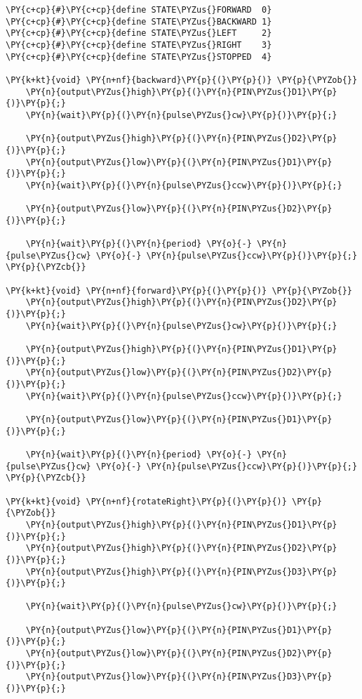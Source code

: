 \begin{Verbatim}[commandchars=\\\{\}]
\PY{c+cp}{#}\PY{c+cp}{define STATE\PYZus{}FORWARD  0}
\PY{c+cp}{#}\PY{c+cp}{define STATE\PYZus{}BACKWARD 1}
\PY{c+cp}{#}\PY{c+cp}{define STATE\PYZus{}LEFT     2}
\PY{c+cp}{#}\PY{c+cp}{define STATE\PYZus{}RIGHT    3}
\PY{c+cp}{#}\PY{c+cp}{define STATE\PYZus{}STOPPED  4}

\PY{k+kt}{void} \PY{n+nf}{backward}\PY{p}{(}\PY{p}{)} \PY{p}{\PYZob{}}
    \PY{n}{output\PYZus{}high}\PY{p}{(}\PY{n}{PIN\PYZus{}D1}\PY{p}{)}\PY{p}{;}
    \PY{n}{wait}\PY{p}{(}\PY{n}{pulse\PYZus{}cw}\PY{p}{)}\PY{p}{;}

    \PY{n}{output\PYZus{}high}\PY{p}{(}\PY{n}{PIN\PYZus{}D2}\PY{p}{)}\PY{p}{;}
    \PY{n}{output\PYZus{}low}\PY{p}{(}\PY{n}{PIN\PYZus{}D1}\PY{p}{)}\PY{p}{;}
    \PY{n}{wait}\PY{p}{(}\PY{n}{pulse\PYZus{}ccw}\PY{p}{)}\PY{p}{;}

    \PY{n}{output\PYZus{}low}\PY{p}{(}\PY{n}{PIN\PYZus{}D2}\PY{p}{)}\PY{p}{;}

    \PY{n}{wait}\PY{p}{(}\PY{n}{period} \PY{o}{-} \PY{n}{pulse\PYZus{}cw} \PY{o}{-} \PY{n}{pulse\PYZus{}ccw}\PY{p}{)}\PY{p}{;}
\PY{p}{\PYZcb{}}

\PY{k+kt}{void} \PY{n+nf}{forward}\PY{p}{(}\PY{p}{)} \PY{p}{\PYZob{}}
    \PY{n}{output\PYZus{}high}\PY{p}{(}\PY{n}{PIN\PYZus{}D2}\PY{p}{)}\PY{p}{;}
    \PY{n}{wait}\PY{p}{(}\PY{n}{pulse\PYZus{}cw}\PY{p}{)}\PY{p}{;}

    \PY{n}{output\PYZus{}high}\PY{p}{(}\PY{n}{PIN\PYZus{}D1}\PY{p}{)}\PY{p}{;}
    \PY{n}{output\PYZus{}low}\PY{p}{(}\PY{n}{PIN\PYZus{}D2}\PY{p}{)}\PY{p}{;}
    \PY{n}{wait}\PY{p}{(}\PY{n}{pulse\PYZus{}ccw}\PY{p}{)}\PY{p}{;}

    \PY{n}{output\PYZus{}low}\PY{p}{(}\PY{n}{PIN\PYZus{}D1}\PY{p}{)}\PY{p}{;}

    \PY{n}{wait}\PY{p}{(}\PY{n}{period} \PY{o}{-} \PY{n}{pulse\PYZus{}cw} \PY{o}{-} \PY{n}{pulse\PYZus{}ccw}\PY{p}{)}\PY{p}{;}
\PY{p}{\PYZcb{}}

\PY{k+kt}{void} \PY{n+nf}{rotateRight}\PY{p}{(}\PY{p}{)} \PY{p}{\PYZob{}}
    \PY{n}{output\PYZus{}high}\PY{p}{(}\PY{n}{PIN\PYZus{}D1}\PY{p}{)}\PY{p}{;}
    \PY{n}{output\PYZus{}high}\PY{p}{(}\PY{n}{PIN\PYZus{}D2}\PY{p}{)}\PY{p}{;}
    \PY{n}{output\PYZus{}high}\PY{p}{(}\PY{n}{PIN\PYZus{}D3}\PY{p}{)}\PY{p}{;}

    \PY{n}{wait}\PY{p}{(}\PY{n}{pulse\PYZus{}cw}\PY{p}{)}\PY{p}{;}

    \PY{n}{output\PYZus{}low}\PY{p}{(}\PY{n}{PIN\PYZus{}D1}\PY{p}{)}\PY{p}{;}
    \PY{n}{output\PYZus{}low}\PY{p}{(}\PY{n}{PIN\PYZus{}D2}\PY{p}{)}\PY{p}{;}
    \PY{n}{output\PYZus{}low}\PY{p}{(}\PY{n}{PIN\PYZus{}D3}\PY{p}{)}\PY{p}{;}


\end{Verbatim}
